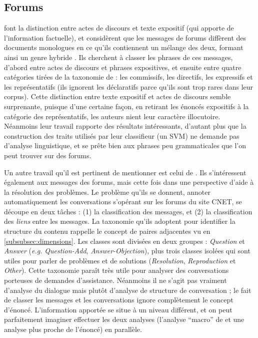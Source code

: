 \documentclass[10pt,a4paper,twoside]{article}
\newcommand{\quotes}[1]{``#1''}
\begin{document}
\subsection{Forums}
\label{subsec:forums}

\citet{qadir2011classifying} font la distinction entre actes de discours et texte expositif (qui apporte de l'information factuelle), et considèrent que les messages de forums diffèrent des documents monologues en ce qu'ils contiennent un mélange des deux, formant ainsi un genre \og hybride \fg. Ils cherchent à classer les phrases de ces messages, d'abord entre actes de discours et phrases expositives, et ensuite entre quatre catégories tirées de la taxonomie de \citet{searle1976taxonomy} : les commissifs, les directifs, les expressifs et les représentatifs (ils ignorent les déclaratifs parce qu'ils sont trop rares dans leur corpus). Cette distinction entre texte expositif et actes de discours semble surprenante, puisque d'une certaine façon, en retirant les énoncés expositifs à la catégorie des représentatifs, les auteurs nient leur caractère illocutoire. Néanmoins leur travail rapporte des résultats intéressants, d'autant plus que la construction des traits utilisés par leur classifieur (un SVM) ne demande pas d'analyse linguistique, et se prête bien aux phrases peu grammaticales que l'on peut trouver sur des forums.

Un autre travail qu'il est pertinent de mentionner est celui de \citet{kim2010tagging}. Ils s'intéressent également aux messages des forums, mais cette fois dans une perspective d'aide à la résolution des problèmes. Le problème qu'ils se donnent, annoter automatiquement les conversations s'opérant sur les forums du site CNET, se découpe en deux tâches : (1) la classification des messages, et (2) la classification des \textit{liens} entre les messages. La taxonomie qu'ils adoptent pour identifier la structure du contenu rappelle le concept de paires adjacentes vu en \ref{subsubsec:dimensions}. Les classes sont divisées en deux groupes : \textit{Question} et \textit{Answer} (\textit{e.g.} \textit{Question-Add}, \textit{Answer-Objection}), plus trois classes isolées qui sont utiles pour parler de problèmes et de solutions (\textit{Resolution}, \textit{Reproduction} et \textit{Other}). Cette taxonomie paraît très utile pour analyser des conversations porteuses de demandes d'assistance. Néanmoins il ne s'agit pas vraiment d'analyse du dialogue mais plutôt d'analyse de structure de conversation ; le fait de classer les messages et les conversations ignore complètement le concept d'énoncé. L'information apportée se situe à un niveau différent, et on peut parfaitement imaginer effectuer les deux analyses (l'analyse \quotes{macro} de \citeauthor{kim2010tagging} et une analyse plus proche de l'énoncé) en parallèle.
\end{document}
